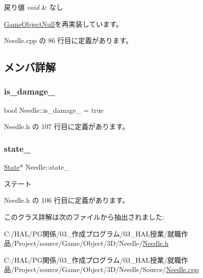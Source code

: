 \begin{DoxyRetVals}{戻り値}
{\em void} & なし \\
\hline
\end{DoxyRetVals}


\mbox{\hyperlink{class_game_object_null_aeeb51b7e7aa41fd0b16f8f7c016bdb55}{Game\+Object\+Null}}を再実装しています。



 Needle.\+cpp の 86 行目に定義があります。



\subsection{メンバ詳解}
\mbox{\label{class_needle_a311dfd4f4dacea81fbd194150b75a946}} 
\subsubsection{\texorpdfstring{is\+\_\+damage\+\_\+}{is\_damage\_}}
{\footnotesize\ttfamily bool Needle\+::is\+\_\+damage\+\_\+ = true\hspace{0.3cm}{\ttfamily [private]}}



 Needle.\+h の 107 行目に定義があります。

\mbox{\label{class_needle_a9ece23f3ee2e844aee7dbbe8d8110218}} 
\subsubsection{\texorpdfstring{state\+\_\+}{state\_}}
{\footnotesize\ttfamily \mbox{\hyperlink{class_needle_1_1_state}{State}}$\ast$ Needle\+::state\+\_\+\hspace{0.3cm}{\ttfamily [private]}}



ステート 



 Needle.\+h の 106 行目に定義があります。



このクラス詳解は次のファイルから抽出されました\+:\begin{DoxyCompactItemize}
\item 
C\+:/\+H\+A\+L/\+P\+G関係/03\+\_\+作成プログラム/03\+\_\+\+H\+A\+L授業/就職作品/\+Project/source/\+Game/\+Object/3\+D/\+Needle/\mbox{\hyperlink{_needle_8h}{Needle.\+h}}\item 
C\+:/\+H\+A\+L/\+P\+G関係/03\+\_\+作成プログラム/03\+\_\+\+H\+A\+L授業/就職作品/\+Project/source/\+Game/\+Object/3\+D/\+Needle/\+Source/\mbox{\hyperlink{_needle_8cpp}{Needle.\+cpp}}\end{DoxyCompactItemize}
